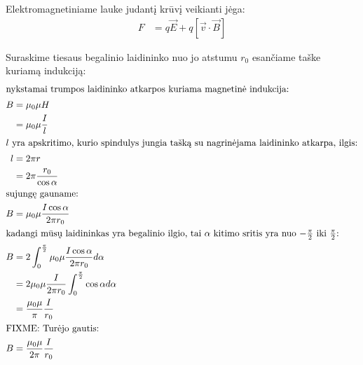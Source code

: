 Elektromagnetiniame lauke judantį krūvį veikianti jėga:
\begin{align*}
  F &= q \vec{E} + q \left[ \vec{v} \cdot \vec{B} \right]
\end{align*}

Suraskime tiesaus begalinio laidininko nuo jo atstumu $r_{0}$ esančiame
taške kuriamą indukciją:
\begin{align*}
  \intertext{nykstamai trumpos laidininko atkarpos kuriama magnetinė
  indukcija:}  
  B
  &= \mu_{0} \mu H \\
  &= \mu_{0} \mu \frac{I}{l} \\
  \intertext{$l$ yra apskritimo, kurio spindulys jungia tašką su 
  nagrinėjama laidininko atkarpa, ilgis:}
  l
  &= 2 \pi r \\
  &= 2 \pi \frac{r_{0}}{\cos \alpha} \\
  \intertext{sujungę gauname:}
  B
  &= \mu_{0} \mu \frac{I \cos \alpha}{2 \pi r_{0}} \\
  \intertext{kadangi mūsų laidininkas yra begalinio ilgio, tai
  $\alpha$ kitimo sritis yra nuo $-\frac{\pi}{2}$ iki $\frac{\pi}{2}$:}
  B
  &= 2 \int _{0} ^{\frac{\pi}{2}} \mu_{0} \mu 
    \frac{I \cos \alpha}{2 \pi r_{0}} d \alpha \\
  &= 2 \mu_{0} \mu \frac{I}{2 \pi r_{0}}
    \int _{0} ^{\frac{\pi}{2}} \cos \alpha d\alpha \\
  &= \frac{\mu_{0} \mu}{\pi} \frac{I}{r_{0}}\\
  \intertext{FIXME: Turėjo gautis:}
  B &= \frac{\mu_{0} \mu}{2 \pi} \frac{I}{r_{0}}
\end{align*}
